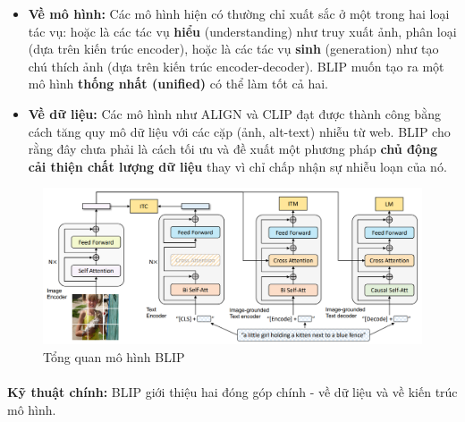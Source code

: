 \begin{itemize}
    \item \textbf{Về mô hình:} Các mô hình hiện có thường chỉ xuất sắc ở một trong hai loại tác vụ: hoặc là các tác vụ \textbf{hiểu} (understanding) như truy xuất ảnh, phân loại (dựa trên kiến trúc encoder), hoặc là các tác vụ \textbf{sinh} (generation) như tạo chú thích ảnh (dựa trên kiến trúc encoder-decoder). BLIP muốn tạo ra một mô hình \textbf{thống nhất (unified)} có thể làm tốt cả hai.
    \item \textbf{Về dữ liệu:} Các mô hình như ALIGN và CLIP đạt được thành công bằng cách tăng quy mô dữ liệu với các cặp (ảnh, alt-text) nhiễu từ web. BLIP cho rằng đây chưa phải là cách tối ưu và đề xuất một phương pháp \textbf{chủ động cải thiện chất lượng dữ liệu} thay vì chỉ chấp nhận sự nhiễu loạn của nó.
\end{itemize}

\begin{figure}[H]
    \centering
    \includegraphics[width=1\linewidth]{img/06-BLIP.png}
    \caption{Tổng quan mô hình BLIP}
\end{figure}

\paragraph{}{\textbf{Kỹ thuật chính:} BLIP giới thiệu hai đóng góp chính - về dữ liệu và về kiến trúc mô hình.}

